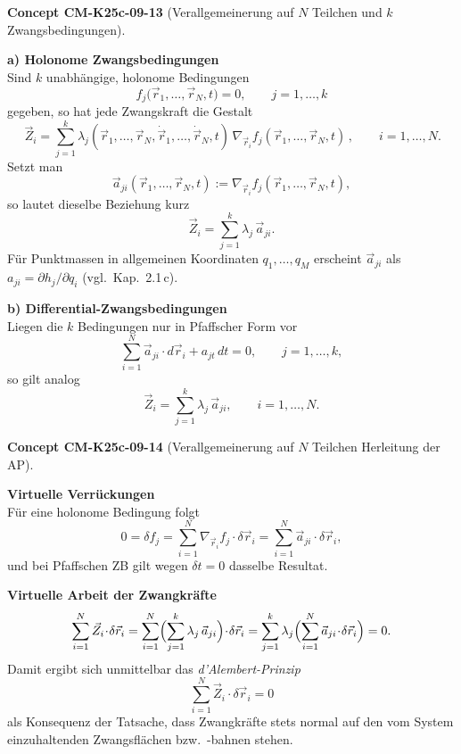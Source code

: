 \documentclass[10pt, letterpaper]{article}
\newcommand{\CustomHeading}[3]{%
  \par\medskip\noindent%
  \textbf{#1 #2} \textnormal{(#3)}.\enskip%
}
\newenvironment{CONC}[2]{\CustomHeading{Concept}{#1}{#2}}{}
\begin{document}
\begin{CONC}{CM-K25c-09-13}{Verallgemeinerung auf $N$ Teilchen und $k$ Zwangsbedingungen}
\textbf{a) Holonome Zwangsbedingungen}\\
Sind $k$ unabhängige, holonome Bedingungen
\[
  f_j\!\bigl(\vec r_1,\dots,\vec r_N,t\bigr)=0,
  \qquad j=1,\dots,k
\]
gegeben, so hat jede Zwangskraft die Gestalt
\[
  \boxed{\,%
    \vec Z_i =
    \sum_{j=1}^{k}
      \lambda_j(\vec r_1,\dots,\vec r_N,
                \dot{\vec r}_1,\dots,\dot{\vec r}_N,t)\,
      \nabla_{\!\vec r_i} f_j(\vec r_1,\dots,\vec r_N,t)
    \,}, \qquad i=1,\dots,N.
\]
Setzt man
\[
  \vec a_{ji}(\vec r_1,\dots,\vec r_N,t)
  :=\nabla_{\!\vec r_i} f_j(\vec r_1,\dots,\vec r_N,t),
\]
so lautet dieselbe Beziehung kurz
\[
  \vec Z_i = \sum_{j=1}^{k}\lambda_j\,\vec a_{ji}.
\]
Für Punktmassen in allgemeinen Koordinaten
\(
  q_1,\dots,q_M
\)
erscheint $\vec a_{ji}$ als
\(
  a_{ji}=\partial h_j/\partial q_i
\)
(vgl.\ Kap.~2.1\,c).

\textbf{b) Differential-Zwangsbedingungen}\\
Liegen die $k$ Bedingungen nur in Pfaffscher Form vor
\[
  \sum_{i=1}^{N}\vec a_{ji}\!\cdot d\vec r_i + a_{jt}\,dt = 0,
  \qquad j=1,\dots,k,
\]
so gilt analog
\[
  \boxed{\,%
    \vec Z_i = \sum_{j=1}^{k}\lambda_j\,\vec a_{ji},
    \qquad i=1,\dots,N.%
  \,}
\]
\end{CONC}

\begin{CONC}{CM-K25c-09-14}{Verallgemeinerung auf $N$ Teilchen Herleitung der AP}
\textbf{Virtuelle Verrückungen}\\
Für eine holonome Bedingung folgt
\[
  0 = \delta f_j
    = \sum_{i=1}^{N}\nabla_{\!\vec r_i}f_j\!\cdot\!\delta\vec r_i
    = \sum_{i=1}^{N}\vec a_{ji}\!\cdot\!\delta\vec r_i,
\]
und bei Pfaffschen ZB gilt wegen $\delta t=0$ dasselbe Resultat.

\textbf{Virtuelle Arbeit der Zwangkräfte}\\
\[
  \sum_{i=1}^{N}\vec Z_i\!\cdot\!\delta\vec r_i
  = \sum_{i=1}^{N}
      \Bigl(\sum_{j=1}^{k}\lambda_j\,\vec a_{ji}\Bigr)
      \!\cdot\!\delta\vec r_i
  = \sum_{j=1}^{k}\lambda_j
      \Bigl(\sum_{i=1}^{N}\vec a_{ji}\!\cdot\!\delta\vec r_i\Bigr)
  = 0.
\]
Damit ergibt sich unmittelbar das \emph{d’Alembert-Prinzip}
\[
  \boxed{\;
    \sum_{i=1}^{N}\vec Z_i\!\cdot\!\delta\vec r_i = 0
  \;}
\]
als Konsequenz der Tatsache, dass Zwangkräfte stets normal auf
den vom System einzuhaltenden Zwangsflächen bzw.\ -bahnen stehen.
\end{CONC}
\end{document}
